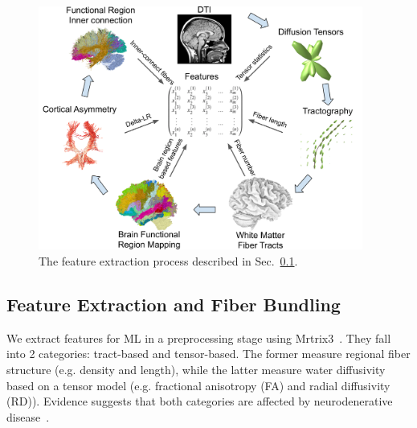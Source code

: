 \begin{figure}[t]
\centering
\includegraphics[width=0.95\textwidth]{images/Brainfeatures.png}
\caption{The feature extraction process described in Sec.~\ref{sec:extraction}.
}
\label{fig:Extraction}
\end{figure}


\subsection{Feature Extraction and Fiber Bundling}
\label{sec:extraction}

\noindent We extract features for ML in a preprocessing stage using Mrtrix3~\cite{TOURNIER2019116137}. They fall into 2 categories: tract-based and tensor-based. The former measure regional fiber structure (e.g. density and length), while the latter measure water diffusivity based on a tensor model (e.g. fractional anisotropy (FA) 
and radial diffusivity (RD)). Evidence suggests that both categories are affected by neurodenerative disease~\cite{sundaram2008diffusion,ji2015white}.

